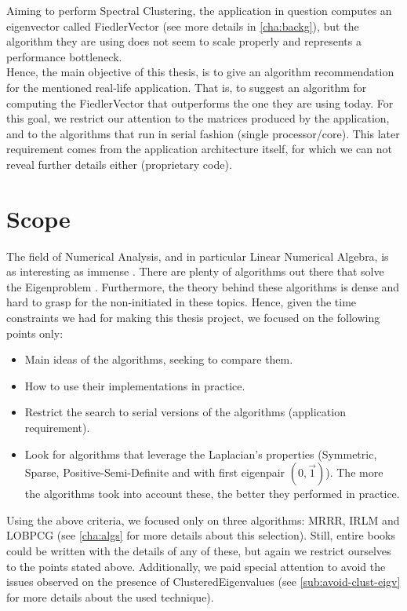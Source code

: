 Aiming to perform Spectral
Clustering, the application in question
computes an eigenvector called \gls{FiedlerVector} (see more
details in \cref{cha:backg}), but the algorithm they are using does
not seem to scale properly and represents a performance bottleneck. \\

Hence, the main objective of this thesis, is to give an algorithm
recommendation for the mentioned real-life application. That is, to
suggest an algorithm for computing the \gls{FiedlerVector} that
outperforms the one they are using today. For this goal, we restrict
our attention to the matrices produced by the application, and to
the algorithms that run in serial fashion (single processor/core). This
later requirement comes from the application architecture itself, for
which we can not reveal further details either (proprietary code).

\section{Scope}

The field of Numerical Analysis, and in particular Linear Numerical
Algebra, is as interesting as immense \cite{golub13}. There are plenty
of algorithms out there that solve the Eigenproblem
\cite{golub00}. Furthermore, the theory behind 
these algorithms is dense and hard to 
grasp for the non-initiated in these topics. Hence, given
the time constraints we had for making this thesis project, we focused
on the following points only:

\begin{itemize}
\item Main ideas of the algorithms, seeking to compare them.
\item How to use their implementations in practice.
\item Restrict the search to serial versions of the algorithms
  (application requirement).
\item Look for algorithms that leverage the \gls{Laplacian}'s properties
  (Symmetric, Sparse, Positive-Semi-Definite and with first eigenpair
  $(0,\vec{1})$). The more the algorithms took into account these, the
  better they performed in practice. 
\end{itemize}

Using the above criteria, we focused only on three algorithms: \gls{MRRR},
\gls{IRLM} and \gls{LOBPCG} (see \cref{cha:algs} for more details
about this selection). Still, entire books could be written with the 
details of any of these, but again we restrict ourselves to the points
stated above. Additionally, we paid 
special attention to avoid the issues observed on the
presence of \gls{ClusteredEigenvalues} (see
\cref{sub:avoid-clust-eigv} for more details about the used
technique). 

